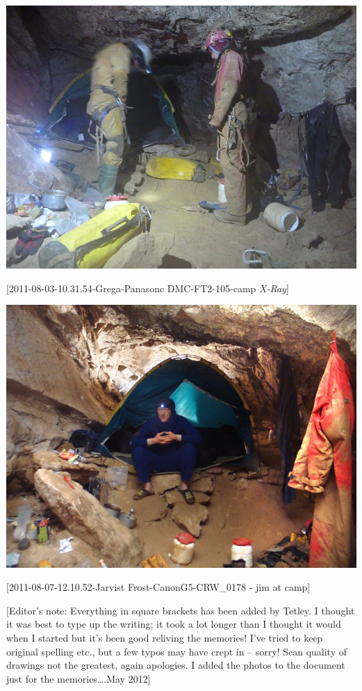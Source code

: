 \includegraphics{UgLog1012/61.png}

{[}2011-08-03-10.31.54-Grega-Panasonc DMC-FT2-105-camp \emph{X-Ray}{]}

\includegraphics{UgLog1012/62.png}

{[}2011-08-07-12.10.52-Jarvist Frost-CanonG5-CRW\_0178 - jim at camp{]}

{[}Editor's note: Everything in square brackets has been added by
Tetley. I thought it was best to type up the writing; it took a lot
longer than I thought it would when I started but it's been good
reliving the memories! I've tried to keep original spelling etc., but a
few typos may have crept in -- sorry! Scan quality of drawings not the
greatest, again apologies. I added the photos to the document just for
the memories\ldots{}.May 2012{]}

